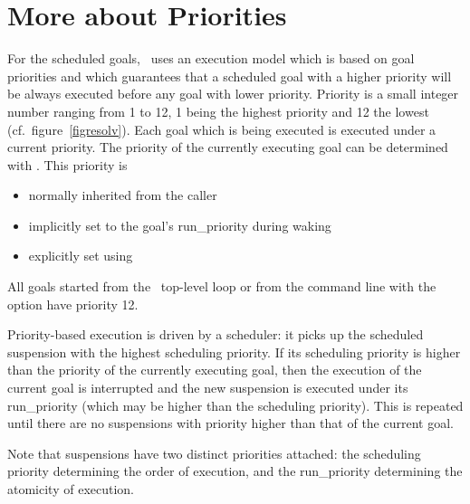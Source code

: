 \section{More about Priorities}
For the scheduled goals,
\eclipse\ uses an execution model which is based on goal priorities
and which guarantees that a scheduled goal with a higher priority
will be always executed before any goal with lower priority.
Priority is a small integer number ranging from 1 to 12,
1 being the highest priority and 12 the lowest
(cf.\ figure~\ref{figresolv}).
Each goal which is being executed is executed under a current priority.
The priority of the currently executing goal can be determined
with .
This priority is
\begin{itemize}
\item normally inherited from the caller
\item implicitly set to the goal's run_priority during waking
\item explicitly set using 
\end{itemize}
All goals started from the \eclipse\ top-level loop
or from the command line with the  option have priority 12.

Priority-based execution is driven by a scheduler:
it picks up the scheduled suspension with the highest scheduling priority.
If its scheduling priority is higher than the priority of the currently
executing goal, then the execution of the current goal
is interrupted and the new suspension is executed under its run_priority
(which may be higher than the scheduling priority).
This is repeated until there are no suspensions
with priority higher than that of the current goal.

Note that suspensions have two distinct priorities attached: the scheduling
priority determining the order of execution, and the run_priority determining
the atomicity of execution.


